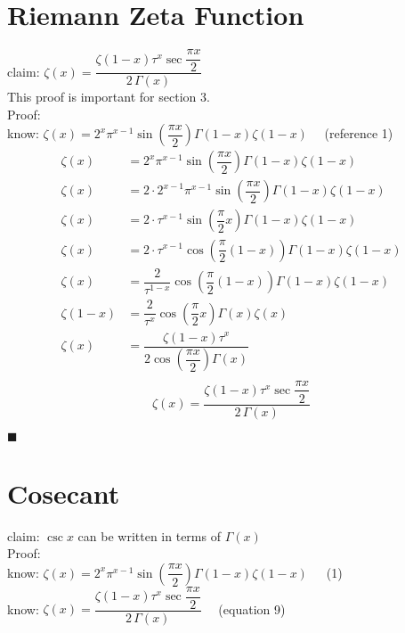 \documentclass[12pt]{article}
\providecommand \pgrp [1] {\left( #1 \right)}   %
\begin{document}
\pagebreak
\section{Riemann Zeta Function}

claim: $\zeta(x) = \dfrac{\zeta(1 - x)\tau^x\sec \dfrac{\pi x}2}{2\,\Gamma(x)}$\\
This proof is important for section 3.\\
Proof:\\
know: $\zeta(x) = 2^x\pi^{x-1}\sin\!\pgrp{\dfrac{\pi x}2}\Gamma(1 - x)\zeta(1 - x)$
~~(reference 1)\\

\begin{align*}
	\zeta(x) & = 2^x \pi^{x-1} \sin\!\pgrp{\dfrac{\pi x}2} \Gamma(1 - x) \zeta(1 - x)\\
	\zeta(x) & = 2 \cdot 2^{x-1} \pi^{x-1} \sin\!\pgrp{\dfrac{\pi x}2}
		\Gamma(1 - x) \zeta(1 - x)\\
	\zeta(x) & = 2 \cdot \tau^{x-1} \sin\!\pgrp{\dfrac \pi 2 x}
		\Gamma(1 - x) \zeta(1 - x)\\
	\zeta(x) & = 2 \cdot \tau^{x-1} \cos\!\pgrp{\dfrac \pi 2 (1 - x)}
		\Gamma(1 - x) \zeta(1 - x)\\
	\zeta(x) & = \dfrac 2{\tau^{1-x}} \cos\!\pgrp{\dfrac \pi 2 (1 - x)}
		\Gamma(1 - x) \zeta(1 - x)\\
	\zeta(1 - x) & = \dfrac 2{\tau^x} \cos\!\pgrp{\dfrac \pi 2 x} \Gamma(x) \zeta(x)\\
	\zeta(x) & = \dfrac{\zeta(1 - x) \tau^x}{2 \cos\!\pgrp{\dfrac{\pi x}2} \Gamma(x)}\\
\end{align*}
\begin{equation}
	\zeta(x) = \dfrac{\zeta(1 - x) \tau^x \sec \dfrac{\pi x}2}{2\,\Gamma(x)}
\end{equation} %

\noindent $\blacksquare$

\pagebreak
\section{Cosecant}
claim: $\csc x$ can be written in terms of $\Gamma(x)$\\
Proof:\\
know: $\zeta(x) = 2^x \pi^{x-1} \sin\!\pgrp{\dfrac{\pi x}2} \Gamma(1 - x)
	\zeta(1 - x)$~~~(1)\\
know: $\zeta(x) = \dfrac{\zeta(1 - x) \tau^x \sec \dfrac{\pi x}2}{2\,\Gamma(x)}$
	~~(equation 9)\\
\end{document}
